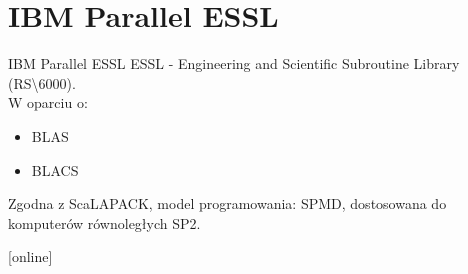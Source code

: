 \section{IBM Parallel ESSL}
	\begin{frame}{IBM Parallel ESSL}
		ESSL - Engineering and Scientific Subroutine Library (RS\textbackslash6000). \\
		W oparciu o:
		\begin{itemize}
			\item BLAS
			\item BLACS
		\end{itemize}
		Zgodna z ScaLAPACK, model programowania: SPMD, dostosowana do komputerów równoległych SP2. \\
		\begin{thebibliography}{9}
		\end{thebibliography}
	\end{frame}